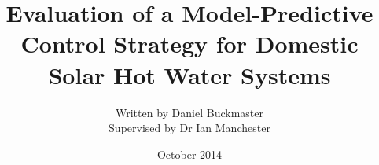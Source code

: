 \documentclass[a4paper, twoside]{book}
\title{Evaluation of a Model-Predictive Control Strategy for Domestic Solar Hot Water Systems}
\author{
   Written by Daniel Buckmaster \\
   Supervised by Dr Ian Manchester
}
\date{October 2014}
\begin{document}
\frontmatter
   \maketitle
   
   
   
   \tableofcontents
   \listoffigures

\mainmatter
   
   
   
   
   

\begin{appendices}
   
   
\end{appendices}

\backmatter
   \printbibliography[heading = bibintoc]
\end{document}
